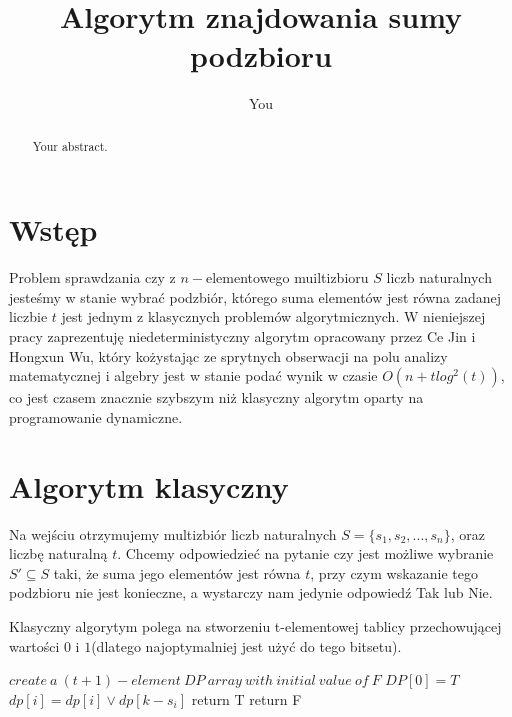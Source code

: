 \documentclass{article}
\title{Algorytm znajdowania sumy podzbioru}
\author{You}
\begin{document}
\maketitle

\begin{abstract}
Your abstract.
\end{abstract}

\section{Wstęp}
Problem sprawdzania czy z $n-$elementowego muiltizbioru $S$ liczb naturalnych jesteśmy w stanie wybrać podzbiór, którego suma elementów jest równa zadanej liczbie $t$ jest jednym z klasycznych problemów algorytmicznych. W nieniejszej pracy zaprezentuję niedeterministyczny algorytm opracowany przez Ce Jin i Hongxun Wu, który kożystając ze sprytnych obserwacji na polu analizy matematycznej i algebry jest w stanie podać wynik w czasie $O(n+tlog^2(t))$, co jest czasem znacznie szybszym niż klasyczny algorytm oparty na programowanie dynamiczne. 

\section{Algorytm klasyczny}

Na wejściu otrzymujemy multizbiór liczb naturalnych $S=\{s_1,s_2,...,s_n\}$, oraz 
liczbę naturalną $t$. Chcemy odpowiedzieć na pytanie czy jest możliwe wybranie 
$S' \subseteq S$ taki, że suma jego elementów jest równa $t$, przy czym wskazanie tego 
podzbioru nie jest konieczne, a wystarczy nam jedynie odpowiedź Tak lub Nie. 


Klasyczny algorytym polega na stworzeniu t-elementowej tablicy przechowującej wartości 
$0$ i $1$(dlatego najoptymalniej jest użyć do tego bitsetu). 

\begin{algorithm}
\caption{}
\begin{algorithmic}
    \STATE $create\ a\ (t+1)-element\ DP\ array\ with\ initial\ value\ of\ F$
    \STATE $DP[0] = T$
    \STATE $dp[i] = dp[i] \lor dp[k-s_i] $
    \ENDFOR
    \STATE return T
    \ENDIF
    \ENDFOR
    \STATE return F
\end{algorithmic}
\end{algorithm}
\end{document}
